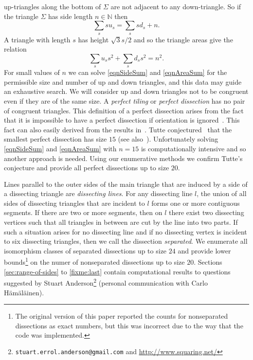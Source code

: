 \documentclass[12pt,amstags,fleqn]{article}
\theoremstyle{plain}
\theoremstyle{definition}
\begin{document}
up-triangles along the bottom of $\Sigma$ are not adjacent to any
down-triangle. So if the triangle $\Sigma$ has side length $n \in
\mathbb{N}$ then
\begin{equation}\label{eqnSideSum}
\sum_{s} s u_{s} = \sum_{s} s d_{s} + n.
\end{equation}
A triangle with length ${s}$ has height $\sqrt{3}{s}/2$ and so 
the triangle areas give the relation
\begin{equation}\label{eqnAreaSum}
\sum_s u_s s^2 + \sum_s d_s s^2 = n^2.
\end{equation}
For small values of $n$ we can solve \eqref{eqnSideSum} and \eqref{eqnAreaSum}
for the permissible
size and number of up and down triangles, and this data may guide an
exhaustive search.
We will consider up and down triangles not to be congruent even
if they are of the same size. A {\em perfect tiling} or
{\em perfect dissection} has no pair of congruent triangles.
This definition of a perfect dissection arises from the fact that 
it is impossible to have a perfect dissection if orientation is
ignored~\cite{MR0003040}. This fact can also easily derived from the
results in~\cite{aleshamming}.
Tutte conjectured~\cite{MR0003040,MR0027521} that the smallest perfect
dissection has size $15$ (see also~\cite{squaring}).  Unfortunately
solving \eqref{eqnSideSum} and \eqref{eqnAreaSum} with $n = 15$ is computationally intensive and so
another approach is needed.  Using our enumerative methods we confirm Tutte's
conjecture and provide all perfect dissections up to size $20$. 


Lines parallel to the outer sides of the main triangle
that are induced by a side
of a dissecting triangle are \emph{dissecting lines}.
For any dissecting line $l$,
the union of all sides of dissecting triangles
that are incident to $l$ forms
one or more contiguous segments. If there are two or more segments,
then on $l$ there exist
two dissecting vertices such that all
triangles in between are cut by the line into two parts. If such
a situation arises for no dissecting line and if no
dissecting vertex is incident to six dissecting triangles,
then we call the dissection {\em separated}.
We enumerate all isomorphism classes of 
separated dissections up to size $24$ and provide lower 
bounds\footnote{The original version of this paper reported the counts for nonseparated dissections
as exact numbers, but this was incorrect due to the way that the code was implemented.}
on the numer of nonseparated dissections up to size $20$.
Sections \ref{sec:range-of-sides} to \ref{fixme:last} contain computational results to questions suggested
by Stuart Anderson\footnote{\texttt{stuart.errol.anderson@gmail.com} and
\url{http://www.squaring.net/}} (personal communication with Carlo H\"{a}m\"{a}l\"{a}inen).
\end{document}

